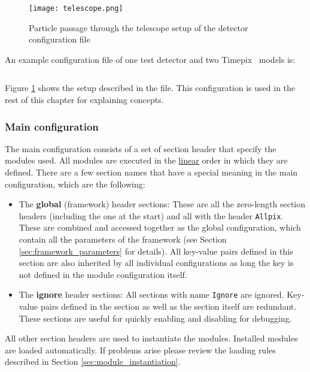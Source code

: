 \begin{figure}[t]
  \centering
  \texttt{[image: telescope.png]}
  \caption{Particle passage through the telescope setup of the detector configuration file}
  \label{fig:telescope}
\end{figure}

An example configuration file of one test detector and two Timepix~\cite{timepix} models is: 
\inputminted[frame=single,framesep=3pt,breaklines=true,tabsize=2,linenos]{ini}{../../etc/manual_detector.conf}
Figure \ref{fig:telescope} shows the setup described in the file. This configuration is used in the rest of this chapter for explaining concepts.

\subsubsection{Main configuration}
\label{sec:main_config}
The main configuration consists of a set of section header that specify the modules used. All modules are executed in the \underline{linear} order in which they are defined. There are a few section names that have a special meaning in the main configuration, which are the following:
\begin{itemize}
\item The \textbf{global} (framework) header sections: These are all the zero-length section headers (including the one at the start) and all with the header \texttt{Allpix}. These are combined and accessed together as the global configuration, which contain all the parameters of the framework (see Section \ref{sec:framework_parameters} for details). All key-value pairs defined in this section are also inherited by all individual configurations as long the key is not defined in the module configuration itself.
\item The \textbf{ignore} header sections: All sections with name \texttt{Ignore} are ignored. Key-value pairs defined in the section as well as the section itself are redundant. These sections are useful for quickly enabling and disabling for debugging.
\end{itemize}
All other section headers are used to instantiate the modules. Installed modules are loaded automatically. If problems arise please review the loading rules described in Section \ref{sec:module_instantiation}.

